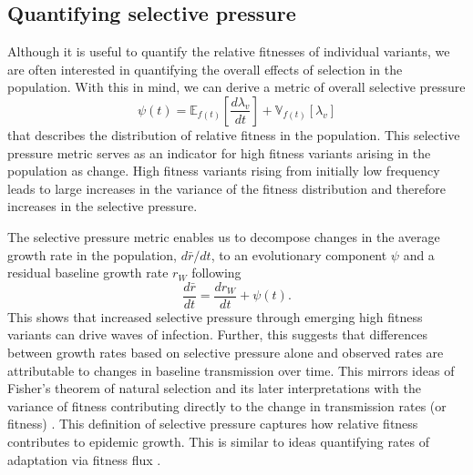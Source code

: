 \documentclass[11pt,oneside,letterpaper]{article}
\newcommand{\Expect}{\mathbb{E}}
\newcommand{\Var}{\mathbb{V}}
\newcommand{\wt}{W}
\begin{document}

\subsection*{Quantifying selective pressure}

Although it is useful to quantify the relative fitnesses of individual variants, we are often interested in quantifying the overall effects of selection in the population.
With this in mind, we can derive a metric of overall selective pressure
\begin{equation}
\psi(t) =  \Expect_{f(t)}\left[ \frac{d \lambda_v}{d t}\right] +  \Var_{f(t)}[\lambda_{v}]
\end{equation}
that describes the distribution of relative fitness in the population.
This selective pressure metric serves as an indicator for high fitness variants arising in the population as change.
High fitness variants rising from initially low frequency leads to large increases in the variance of the fitness distribution and therefore increases in the selective pressure.

The selective pressure metric enables us to decompose changes in the average growth rate in the population, $d\bar{r}/dt$, to an evolutionary component $\psi$ and a residual baseline growth rate $r_\wt$ following
\begin{equation}
    \frac{d\bar{r}}{dt} = \frac{dr_{\wt}}{dt} + \psi(t).
\end{equation}
This shows that increased selective pressure through emerging high fitness variants can drive waves of infection.
Further, this suggests that differences between growth rates based on selective pressure alone and observed rates are attributable to changes in baseline transmission over time.
This mirrors ideas of Fisher's theorem of natural selection and its later interpretations with the variance of fitness contributing directly to the change in transmission rates (or fitness) \cite{Ewens1989, Ewens2024}.
This definition of selective pressure captures how relative fitness contributes to epidemic growth.
This is similar to ideas quantifying rates of adaptation via fitness flux \cite{Mustonen2010}.
\end{document}
